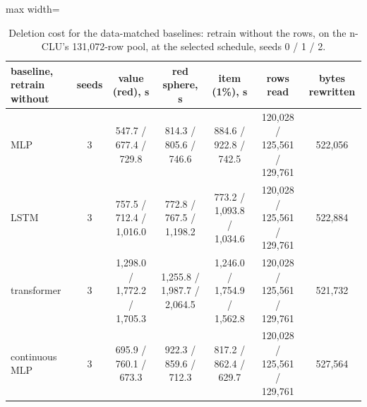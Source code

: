 \documentclass{article} %
\begin{document}
\begin{table}[h]
\centering\small
\caption{Deletion cost for the data-matched baselines: retrain without the rows, on the n-CLU's %
131,072-row pool, at the selected schedule, seeds 0 / 1 / 2.}
\label{tab:rivals-del}
\setlength{\tabcolsep}{3pt}
\begin{adjustbox}{max width=\linewidth}\begin{tabular}{lcccccc}
\toprule
baseline, retrain without & seeds & value (red), s & red sphere, s & item (1\%), s & rows read & bytes rewritten \\
\midrule
MLP & 3 & 547.7 / 677.4 / 729.8 & 814.3 / 805.6 / 746.6 & 884.6 / 922.8 / 742.5 & 120,028 / 125,561 / 129,761 & 522,056 \\
LSTM & 3 & 757.5 / 712.4 / 1,016.0 & 772.8 / 767.5 / 1,198.2 & 773.2 / 1,093.8 / 1,034.6 & 120,028 / 125,561 / 129,761 & 522,884 \\
transformer & 3 & 1,298.0 / 1,772.2 / 1,705.3 & 1,255.8 / 1,987.7 / 2,064.5 & 1,246.0 / 1,754.9 / 1,562.8 & 120,028 / 125,561 / 129,761 & 521,732 \\
continuous MLP & 3 & 695.9 / 760.1 / 673.3 & 922.3 / 859.6 / 712.3 & 817.2 / 862.4 / 629.7 & 120,028 / 125,561 / 129,761 & 527,564 \\
\bottomrule
\end{tabular}\end{adjustbox}
\end{table}
\end{document}
